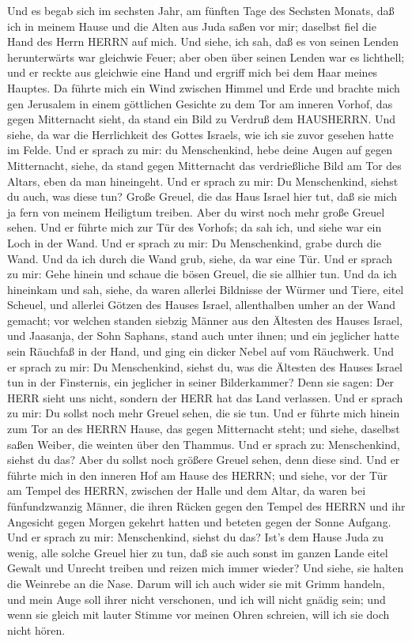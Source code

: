  Und es begab sich im sechsten Jahr, am fünften Tage des
Sechsten Monats, daß ich in meinem Hause und die Alten aus Juda saßen
vor mir; daselbst fiel die Hand des Herrn HERRN auf mich. 
Und siehe, ich sah, daß es von seinen Lenden herunterwärts war gleichwie
Feuer; aber oben über seinen Lenden war es lichthell;  und
er reckte aus gleichwie eine Hand und ergriff mich bei dem Haar meines
Hauptes. Da führte mich ein Wind zwischen Himmel und Erde und brachte
mich gen Jerusalem in einem göttlichen Gesichte zu dem Tor am inneren
Vorhof, das gegen Mitternacht sieht, da stand ein Bild zu Verdruß dem
HAUSHERRN.  Und siehe, da war die Herrlichkeit des Gottes
Israels, wie ich sie zuvor gesehen hatte im Felde.  Und er
sprach zu mir: du Menschenkind, hebe deine Augen auf gegen Mitternacht,
siehe, da stand gegen Mitternacht das verdrießliche Bild am Tor des
Altars, eben da man hineingeht.  Und er sprach zu mir: Du
Menschenkind, siehst du auch, was diese tun? Große Greuel, die das Haus
Israel hier tut, daß sie mich ja fern von meinem Heiligtum treiben. Aber
du wirst noch mehr große Greuel sehen.  Und er führte mich
zur Tür des Vorhofs; da sah ich, und siehe war ein Loch in der Wand.
 Und er sprach zu mir: Du Menschenkind, grabe durch die
Wand. Und da ich durch die Wand grub, siehe, da war eine Tür.
 Und er sprach zu mir: Gehe hinein und schaue die bösen
Greuel, die sie allhier tun.  Und da ich hineinkam und sah,
siehe, da waren allerlei Bildnisse der Würmer und Tiere, eitel Scheuel,
und allerlei Götzen des Hauses Israel, allenthalben umher an der Wand
gemacht;  vor welchen standen siebzig Männer aus den
Ältesten des Hauses Israel, und Jaasanja, der Sohn Saphans, stand auch
unter ihnen; und ein jeglicher hatte sein Räuchfaß in der Hand, und ging
ein dicker Nebel auf vom Räuchwerk.  Und er sprach zu mir:
Du Menschenkind, siehst du, was die Ältesten des Hauses Israel tun in
der Finsternis, ein jeglicher in seiner Bilderkammer? Denn sie sagen:
Der HERR sieht uns nicht, sondern der HERR hat das Land verlassen.
 Und er sprach zu mir: Du sollst noch mehr Greuel sehen,
die sie tun.  Und er führte mich hinein zum Tor an des
HERRN Hause, das gegen Mitternacht steht; und siehe, daselbst saßen
Weiber, die weinten über den Thammus.  Und er sprach zu:
Menschenkind, siehst du das? Aber du sollst noch größere Greuel sehen,
denn diese sind.  Und er führte mich in den inneren Hof am
Hause des HERRN; und siehe, vor der Tür am Tempel des HERRN, zwischen
der Halle und dem Altar, da waren bei fünfundzwanzig Männer, die ihren
Rücken gegen den Tempel des HERRN und ihr Angesicht gegen Morgen gekehrt
hatten und beteten gegen der Sonne Aufgang.  Und er sprach
zu mir: Menschenkind, siehst du das? Ist's dem Hause Juda zu wenig, alle
solche Greuel hier zu tun, daß sie auch sonst im ganzen Lande eitel
Gewalt und Unrecht treiben und reizen mich immer wieder? Und siehe, sie
halten die Weinrebe an die Nase.  Darum will ich auch wider
sie mit Grimm handeln, und mein Auge soll ihrer nicht verschonen, und
ich will nicht gnädig sein; und wenn sie gleich mit lauter Stimme vor
meinen Ohren schreien, will ich sie doch nicht hören.

